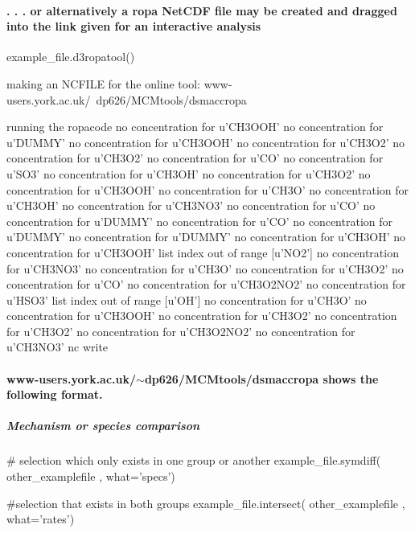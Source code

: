\paragraph*{. . . or alternatively a ropa Net\+C\+DF file may be created and dragged into the link given for an interactive analysis}


\begin{DoxyCode}
example\_file.d3ropatool()
\end{DoxyCode}
 \begin{DoxyVerb}making an NCFILE for the online tool: 
www-users.york.ac.uk/~dp626/MCMtools/dsmaccropa

running the ropacode
no concentration for u'CH3OOH'
no concentration for u'DUMMY'
no concentration for u'CH3OOH'
no concentration for u'CH3O2'
no concentration for u'CH3O2'
no concentration for u'CO'
no concentration for u'SO3'
no concentration for u'CH3OH'
no concentration for u'CH3O2'
no concentration for u'CH3OOH'
no concentration for u'CH3O'
no concentration for u'CH3OH'
no concentration for u'CH3NO3'
no concentration for u'CO'
no concentration for u'DUMMY'
no concentration for u'CO'
no concentration for u'DUMMY'
no concentration for u'DUMMY'
no concentration for u'CH3OH'
no concentration for u'CH3OOH'
list index out of range [u'NO2']
no concentration for u'CH3NO3'
no concentration for u'CH3O'
no concentration for u'CH3O2'
no concentration for u'CO'
no concentration for u'CH3O2NO2'
no concentration for u'HSO3'
list index out of range [u'OH']
no concentration for u'CH3O'
no concentration for u'CH3OOH'
no concentration for u'CH3O2'
no concentration for u'CH3O2'
no concentration for u'CH3O2NO2'
no concentration for u'CH3NO3'
nc write
\end{DoxyVerb}


\paragraph*{www-\/users.\+york.\+ac.\+uk/$\sim$dp626/\+M\+C\+Mtools/dsmaccropa shows the following format.}



\subparagraph*{Mechanism or species comparison}


\begin{DoxyCode}
# selection which only exists in one group or another 
example\_file.symdiff(   other\_examplefile , what='specs')

#selection that exists in both groups
example\_file.intersect( other\_examplefile , what='rates')
\end{DoxyCode}
 